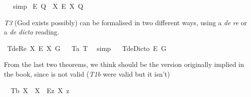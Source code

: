 \begin{isabellebody}
\ %
%
\isamarkupfalse%
\ simp%
%
%
\isanewline
{}\isamarkupfalse%
\ {\isachardoublequoteopen}{\isasymlfloor}\isactrlbold {\isasymbox}\isactrlbold {\isasymexists}\isactrlsup E\ {\isacharparenleft}Q{\isacharcolon}{\isacharcolon}{\isasymup}{\isasymlangle}{\isasymzero}{\isasymrangle}{\isacharparenright}\ \isactrlbold {\isasymleftrightarrow}\ {\isacharparenleft}{\isacharparenleft}{\isasymlambda}X{\isachardot}\ \isactrlbold {\isasymbox}\isactrlbold {\isasymexists}\isactrlsup E\ X{\isacharparenright}\ \isactrlbold {\isasymdown}Q{\isacharparenright}{\isasymrfloor}{\isachardoublequoteclose}\ \isamarkupfalse%
%
\ %
%
\isamarkupfalse%
\ %
%
%
%
%
\begin{isamarkuptext}%
\emph{T3} (God exists possibly) can be formalised in two different ways, using a \emph{de re} or a \emph{de dicto} reading.%
\end{isamarkuptext}\isamarkuptrue%
\isamarkupfalse%
\ T{}{\isacharunderscore}deRe{\isacharcolon}\ {\isachardoublequoteopen}{\isasymlfloor}{\isacharparenleft}{\isasymlambda}X{\isachardot}\ \isactrlbold {\isasymdiamond}\isactrlbold {\isasymexists}\isactrlsup E\ X{\isacharparenright}\ \isactrlbold {\isasymdown}G{\isasymrfloor}{\isachardoublequoteclose}%
\ %
%
\isamarkupfalse%
\ T{}a\ T{}\ \isamarkupfalse%
\ simp%
%
%
\ \isanewline
{}\isamarkupfalse%
\ T{}{\isacharunderscore}deDicto{\isacharcolon}\ {\isachardoublequoteopen}{\isasymlfloor}\isactrlbold {\isasymdiamond}\isactrlbold {\isasymexists}\isactrlsup E\ \isactrlbold {\isasymdown}G{\isasymrfloor}{\isachardoublequoteclose}\ \isamarkupfalse%
%
\ %
%
\isamarkupfalse%
\ \ \ \ %
%
%
%
%
\begin{isamarkuptext}%
From the last two theorems, we think  should be the version originally implied in the book,
 since  is not valid (\emph{T1b} were valid but it isn't)%
\end{isamarkuptext}\isamarkuptrue%
\isamarkupfalse%
\ \ T{}b{\isacharcolon}\ {\isachardoublequoteopen}{\isasymlfloor}\isactrlbold {\isasymforall}X{\isachardot}\ {\isasymP}\ {\isasymdown}X\ \isactrlbold {\isasymrightarrow}\ \isactrlbold {\isasymdiamond}{\isacharparenleft}\isactrlbold {\isasymexists}\isactrlsup Ez{\isachardot}\ X\ z{\isacharparenright}{\isasymrfloor}{\isachardoublequoteclose}\ \isanewline

\end{isabellebody}
